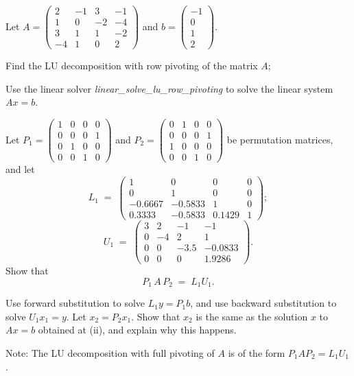 \begin{exercises}
\item Let $A = \begin{pmatrix} 2&-1&3&-1\\ 1&0&-2&-4\\ 3&1&1&-2\\ -4&1&0&2\end{pmatrix}$ and
$b = \begin{pmatrix} -1\\ 0\\ 1\\ 2\end{pmatrix}$.
\begin{subparts}
\item Find the LU decomposition with row pivoting of the matrix $A$;
\item Use the linear solver \textit{linear\_solve\_lu\_row\_pivoting} to solve the linear
system $Ax = b$.
\item Let $P_1 = \begin{pmatrix} 1&0&0&0\\ 0&0&0&1\\ 0&1&0&0\\ 0&0&1&0\end{pmatrix}$ and
$P_2 = \begin{pmatrix} 0&1&0&0\\ 0&0&0&1\\ 1&0&0&0\\ 0&0&1&0\end{pmatrix}$ be permutation
matrices, and let
\[
L_1 \;=\; \begin{pmatrix} 1&0&0&0\\ 0&1&0&0\\ -0.6667&-0.5833&1&0\\ 0.3333&-0.5833&0.1429&1\end{pmatrix};
\]
\[
U_1 \;=\; \begin{pmatrix} 3&2&-1&-1\\ 0&-4&2&1\\ 0&0&-3.5&-0.0833\\ 0&0&0&1.9286\end{pmatrix}.
\]
Show that
\[
P_1\,A\,P_2 \;=\; L_1U_1.
\]
\item Use forward substitution to solve $L_1y = P_1b$, and use backward substitution to
solve $U_1x_1 = y$. Let $x_2 = P_2x_1$. Show that $x_2$ is the same as the solution
$x$ to $Ax = b$ obtained at (ii), and explain why this happens.
\end{subparts}
\noindent Note: The LU decomposition with full pivoting of $A$ is of the form
$P_1AP_2 = L_1U_1$.


\end{exercises}
